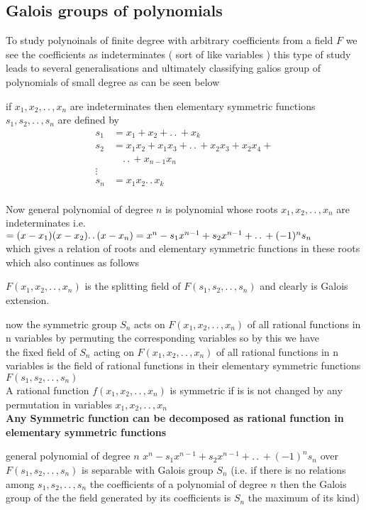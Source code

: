 \documentclass[11pt]{extarticle}
\newcommand{\ck}{.\,.\,}
\newcommand{\snote}[1]{{\footnotesize(#1)}}
\newcommand{\tbx}[2][]{
\begin{tcolorbox}[enhanced,breakable,size=small,colback=black!2!white,title={#1},arc is angular, arc=1.5mm,drop fuzzy shadow]
	#2
\end{tcolorbox}
}
\begin{document}
\begin{multicols}{2}
\subsection{Galois groups of polynomials}
\tbx{ To study polynoinals of finite degree with arbitrary coefficients from a field $ F $ we see the coefficients as indeterminates ( sort of like variables )  this type of study leads to several generalisations and ultimately classifying galios group of polynomials of small degree as can be seen below}
\tbx[elementary symmetric functions]{ if $ x_1,x_2,\ck ,x_n $ are indeterminates then  elementary symmetric functions $ s_1,s_2,\ck , s_n$ are defined by 
\begin{align*}
	s_1 &= x_1+x_2+\ck+x_k\\
	s_2 &= x_1x_2+x_1x_3+\ck+x_2x_3+x_2x_4+\\
	& \quad\ck+x_{n-1}x_n\\
	\vdots\\
	s_n&= x_1x_2\ck x_k\\
	\end{align*} }
\tbx{ Now general polynomial of degree $ n $ is polynomial whose roots $ x_1,x_2,\ck ,x_n $ are indeterminates i.e.\\
$ =(x-x_1)(x-x_2)\ck (x-x_n)\\
= x^n-s_1x^{n-1}+s_2x^{n-1}+\ck+(-1)^ns_n$ \\
which gives a relation of roots and elementary symmetric functions in these roots which also continues as follows}
\tbx{ $ F(x_1,x_2,\ck,x_n) $  is the splitting field of $ F(s_1,s_2,\ck,s_n) $ and clearly is Galois extension.}
\tbx{ now the symmetric group $ S_n $ acts on $ F(x_1,x_2,\ck,x_n) $ of all rational functions in n variables  by permuting the corresponding variables so by this we have \\
the fixed field of $ S_n $  acting on $ F(x_1,x_2,\ck,x_n) $ of all rational functions in n variables  is the field of rational functions in their elementary symmetric functions  $ F(s_1,s_2,\ck,s_n) $ 
\\
A rational function  $ f(x_1,x_2,\ck,x_n) $  is symmetric if is is not changed by any permutation in variables  $x_1,x_2,\ck,x_n$\\
\textbf{Any Symmetric function can be decomposed as rational function in elementary symmetric functions} }
\tbx[Existence of $ S_n $ Galois group]{ general polynomial of degree $ n $ $x^n-s_1x^{n-1}+s_2x^{n-1}+\ck+(-1)^ns_n$
over $ F(s_1,s_2,\ck,s_n) $ is separable with Galois group $ S_n $
 \snote{i.e. if there is no relations among $s_1,s_2,\ck,s_n $ the coefficients of a polynomial of degree $ n $ then the Galois group of the the field generated by its coefficients is $ S_n $ the maximum of its kind}}
 

\end{multicols}
\end{document}
